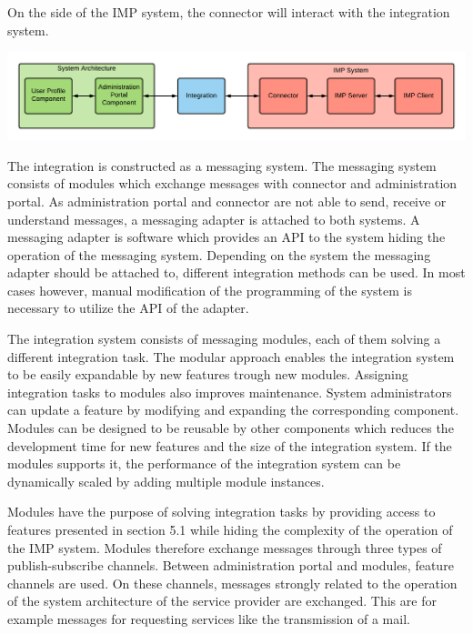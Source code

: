On the side of the IMP system, the connector will interact with the integration system.

\begin{center}
    \includegraphics[scale=0.6]{Diagrams/Integration Architecture 1/Technological Integration/2. System Overview.pdf}
\end{center}

The integration is constructed as a messaging system. The messaging system consists of modules which exchange messages with connector and administration portal. As administration portal and connector are not able to send, receive or understand messages, a messaging adapter is attached to both systems. A messaging adapter is software which provides an API to the system hiding the operation of the messaging system. Depending on the system the messaging adapter should be attached to, different integration methods can be used. In most cases however, manual modification of the programming of the system is necessary to utilize the API of the adapter.

The integration system consists of messaging modules, each of them solving a different integration task. The modular approach enables the integration system to be easily expandable by new features trough new modules. Assigning integration tasks to modules also improves maintenance. System administrators can update a feature by modifying and expanding the corresponding component.
Modules can be designed to be reusable by other components which reduces the development time for new features and the size of the integration system. If the modules supports it, the performance of the integration system can be dynamically scaled by adding multiple module instances.

Modules have the purpose of solving integration tasks by providing access to features presented in section 5.1 while hiding the complexity of the operation of the IMP system. Modules therefore exchange messages through three types of publish-subscribe channels. Between administration portal and modules, feature channels are used. On these channels, messages strongly related to the operation of the system architecture of the service provider are exchanged. This are for example messages for requesting services like the transmission of a mail.

